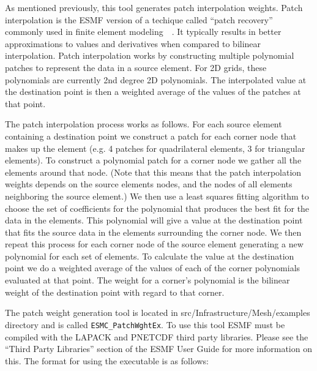   As mentioned previously, this tool generates patch interpolation weights. Patch
interpolation is the ESMF version of a techique called ``patch recovery'' commonly
used in finite element modeling~\cite{PatchInterp1}~\cite{PatchInterp2}. It typically results in better approximations to values and derivatives when compared to bilinear interpolation.  
Patch interpolation works by constructing multiple polynomial patches to represent
the data in a source element. For 2D grids, these polynomials 
are currently 2nd degree 2D polynomials. The interpolated value at the destination point is then a weighted average of the values of the patches at that point. 

The patch interpolation process works as follows. 
For each source element containing a destination point
we construct a patch for each corner node that makes up the element (e.g. 4 patches for 
quadrilateral elements, 3 for triangular elements). To construct a polynomial patch for
 a corner node we gather all the elements around that node. 
(Note that this means that the patch interpolation weights depends on the source elements nodes,
and the nodes of all elements neighboring the source element.)  We then use a least squares fitting 
algorithm to choose the set of coefficients for the polynomial
 that produces the best fit for the data in the elements. This polynomial will give
a value at the destination point that fits the source data in the elements surrounding
the corner node. We then repeat this process for each corner node of the source element
generating a new polynomial for each set of elements.  To calculate the value
at the destination point we do a weighted average of the values of each of the corner polynomials evaluated
at that point. The weight for a corner's polynomial is the bilinear weight of the destination 
point with regard to that corner.  


 The patch weight generation tool is located in src/Infrastructure/Mesh/examples directory and is called
{\tt ESMC\_PatchWghtEx}. To use this tool ESMF must be compiled with the LAPACK and PNETCDF third party libraries. Please see the ``Third Party Libraries'' section of the ESMF User Guide for more information on this. The format for using the executable is as follows:

